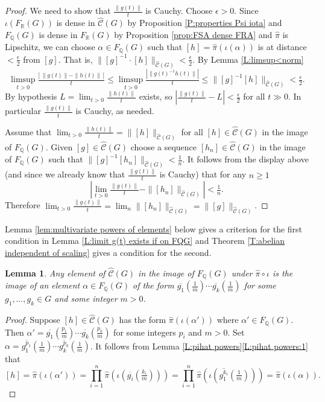 \documentclass[12pt]{amsart}
\newtheorem{lemma}[prop]{Lemma}
\theoremstyle{definition}
\def\QQ{\ensuremath{\mathbb{Q}}}
\def\RR{\ensuremath{\mathbb{R}}}
\def\Free{F}
\def\tC{\hat{\mathcal{C}}}
\begin{document}
\begin{proof}
We need to show that $\tfrac{\|g(t)\|}{t}$ is Cauchy.
Choose $\epsilon>0$.
Since $\iota(\Free_\RR(G))$ is dense in $\tC(G)$ by Proposition \ref{P:properties Psi iota} and $\Free_\QQ(G)$ is dense in $\Free_\RR(G)$ by Proposition \ref{prop:FSA dense FRA}  and $\hat{\pi}$ is Lipschitz, we can choose $\alpha \in \Free_\QQ(G)$ such that $[h]=\hat{\pi}(\iota(\alpha))$ is at distance $<\tfrac{\epsilon}{2}$ from $[g]$.
That is, $\| [g]^{-1}\cdot[h]\|_{\tC(G)}<\tfrac{\epsilon}{2}$.
By Lemma \ref{L:limsup<norm} 
\[
\limsup_{t>0} \tfrac{| \, \|g(t)\|-\|h(t)\|\, |}{t} \leq 
\limsup_{t>0} \tfrac{|  \|g(t)^{-1}h(t)\| |}{t} \leq
\| [g]^{-1} [h]\|_{\tC(G)} < \tfrac{\epsilon}{2}.
\]
By hypothesis $L=\lim_{t>0} \tfrac{\| h(t)\|}{t}$ exists, so $|\tfrac{\|g(t)\|}{t}-L|<\tfrac{\epsilon}{2}$ for all $t \gg 0$.
In particular $\tfrac{\|g(t)\|}{t}$ is Cauchy, as needed.

Assume that $\lim_{t>0} \tfrac{\|h(t)\|}{t}=\|[h]\|_{\tC(G)}$ for all $[h] \in \tC(G)$ in the image of $\Free_\QQ(G)$.
Given $[g] \in \tC(G)$ choose a sequence $[h_n] \in \tC(G)$ in the image of $\Free_\QQ(G)$ such that $\| [g]^{-1} [h_n]\|_{\tC(G)}< \tfrac{1}{n}$.
It follows from the display above (and since we already know that $\tfrac{\|g(t)\|}{t}$ is Cauchy) that for any $n \geq 1$
\[
\left| \lim_{t>0} \tfrac{\|g(t)\|}{t}-\|[h_n]\|_{\tC(G)} \right| < \tfrac{1}{n}.
\]
Therefore $\lim_{t>0} \tfrac{\|g(t)\|}{t} = \lim_n \|[h_n]\|_{\tC(G)} = \| [g]\|_{\tC(G)}$. %
\end{proof}










Lemma \ref{lem:multivariate powers of elements} below gives a criterion for the first condition in Lemma \ref{L:limit g(t) exists if on FQG} and Theorem \ref{T:abelian independent of scaling} gives a condition for the second.




\begin{lemma}\label{lemma:images FQG in CG}
Any element of $\tC(G)$ in the image of $\Free_\QQ(G)$ under $\hat{\pi} \circ \iota$ is the image of an element $\alpha \in \Free_\QQ(G)$ of the form $\overline{g_1}(\tfrac{1}{m}) \cdots \overline{g_k}(\tfrac{1}{m})$ for some $g_1,\dots,g_k \in G$ and some integer $m>0$.
\end{lemma}

\begin{proof}
Suppose $[h] \in \tC(G)$ has the form $\hat{\pi}(\iota(\alpha'))$ where $\alpha' \in \Free_\QQ(G)$.
Then $\alpha'=\overline{g_1}(\tfrac{p_1}{m}) \cdots \overline{g_k}(\tfrac{p_k}{m})$ for some integers $p_i$ and $m>0$.
Set $\alpha=\overline{g_1^{p_1}}(\tfrac{1}{m}) \cdots \overline{g_k^{p_k}}(\tfrac{1}{m})$.
It follows from Lemma \ref{L:pihat powers}\ref{L:pihat powers:1} that
\[
[h]=\hat{\pi}(\iota(\alpha')) = 
\prod_{i=1}^n\hat{\pi}(\iota(\overline{g_i}(\tfrac{k_i}{m}))) = 
\prod_{i=1}^n\hat{\pi}(\iota(\overline{g_1^{k_i}}(\tfrac{1}{m}))) = 
\hat{\pi}(\iota(\alpha)).
\]
\end{proof}
\end{document}

